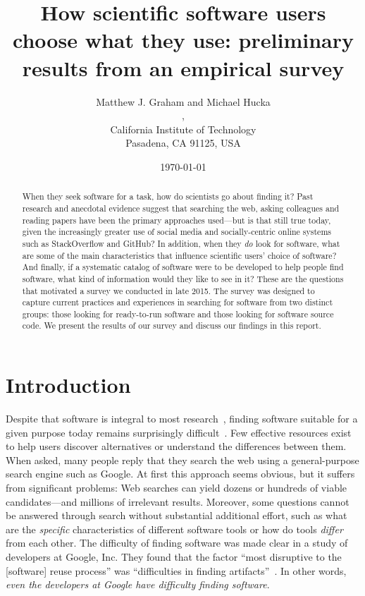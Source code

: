 \documentclass{casicswhitepaper}
\begin{document}
\title{How scientific software users choose what they use: preliminary results from an empirical survey}
\date{\today}
\author{Matthew J. Graham and Michael Hucka\\
,\quad{}\\
California Institute of Technology\\
Pasadena, CA 91125, USA}
\maketitle

\begin{abstract}
When they seek software for a task, how do scientists go about finding it?  Past research and anecdotal evidence suggest that searching the web, asking colleagues and reading papers have been the primary approaches used---but is that still true today, given the increasingly greater use of social media and socially-centric online systems such as StackOverflow and GitHub?  In addition, when they \emph{do} look for software, what are some of the main characteristics that influence scientific users' choice of software?  And finally, if a systematic catalog of software were to be developed to help people find software, what kind of information would they like to see in it?  These are the questions that motivated a survey we conducted in late 2015.  The survey was designed to capture current practices and experiences in searching for software from two distinct groups: those looking for ready-to-run software and those looking for software source code.  We present the results of our survey and discuss our findings in this report.
\end{abstract}


\section{Introduction}

Despite that software is integral to most research~\citep{bauer2014exploratory, hettrick_2014, hannay_2009, baxter_2006, wilson_2006}, finding software suitable for a given purpose today remains surprisingly difficult~\cite{cannata_2005, Bourne::2015, SoftwareDiscoveryIndex:2014}.  Few effective resources exist to help users discover alternatives or understand the differences between them.  When asked, many people reply that they search the web using a general-purpose search engine such as Google.  At first this approach seems obvious, but it suffers from significant problems: Web searches can yield dozens or hundreds of viable candidates---and millions of irrelevant results.  Moreover, some questions cannot be answered through search without substantial additional effort, such as what are the \emph{specific} characteristics of different software tools or how do tools \emph{differ} from each other.  The difficulty of finding software was made clear in a study of developers at Google, Inc.  They found that the factor ``most disruptive to the [software] reuse process'' was ``difficulties in finding artifacts''~\cite{bauer2014exploratory}.  In other words, \emph{even the developers at Google have difficulty finding software}.
\end{document}
